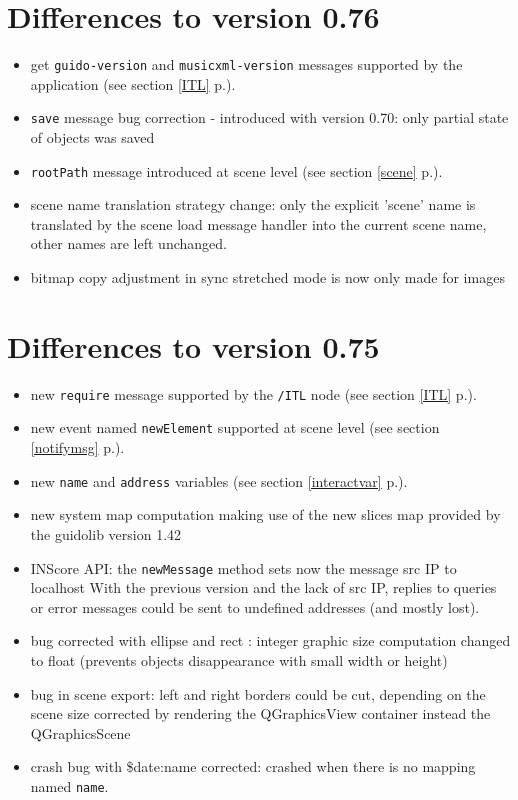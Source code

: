 \documentclass[a4paper,twoside]{report}
\newcommand{\sublevel}[1]	{\section{#1}}
\newcommand{\fullref}[1]	{\ref{#1} p.\pageref{#1}}
\newcommand{\OSC}[1]		{\texttt{#1}}
\begin{document}
\sublevel{Differences to version 0.76}
\begin{itemize}
\item  get \OSC{guido-version} and \OSC{musicxml-version} messages supported by the application (see section \fullref{ITL}).
\item  \OSC{save} message bug correction - introduced with version 0.70: only partial state of objects was saved
\item  \OSC{rootPath} message introduced at scene level (see section \fullref{scene}).
\item  scene name translation strategy change: only the explicit 'scene' name is 
  translated by the scene load message handler into the current scene name, 
  other names are left unchanged.
\item  bitmap copy adjustment in sync stretched mode is now only made for images
\end{itemize}


\sublevel{Differences to version 0.75}
\begin{itemize}
\item new \OSC{require} message supported by the \OSC{/ITL} node (see section \fullref{ITL}).
\item new event named \OSC{newElement} supported at scene level (see section \fullref{notifymsg}).
\item new \OSC{name} and \OSC{address} variables (see section \fullref{interactvar}).
\item new system map computation making use of the new slices map provided by the guidolib version 1.42
\item INScore API: the \OSC{newMessage} method sets now the message src IP to localhost
  With the previous version and the lack of src IP, replies to queries or error 
  messages could be sent to undefined addresses (and mostly lost).
\item bug corrected with ellipse and rect : integer graphic size computation changed 
  to float (prevents objects disappearance with small width or height)
\item bug in scene export: left and right borders could be cut, depending  on the scene size
  corrected by rendering the QGraphicsView container instead the QGraphicsScene
\item crash bug with \$date:name corrected: crashed when there is no mapping named \OSC{name}.
\end{itemize}
\end{document}

